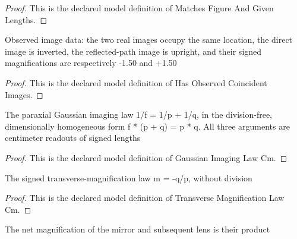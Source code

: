 \begin{proof}
  This is the declared model definition of Matches Figure And Given Lengths.
\end{proof}
\begin{definition}
  \label{def:physics:phyx-mini-0034:phyxminiproblems-problemphyxmini0034-hasobservedcoincidentimages}
  Observed image data: the two real images occupy the same location, the direct image is inverted, the reflected-path image is upright, and their signed magnifications are respectively -1.50 and +1.50
\end{definition}
\begin{proof}
  This is the declared model definition of Has Observed Coincident Images.
\end{proof}
\begin{definition}
  \label{def:physics:phyx-mini-0034:phyxminiproblems-problemphyxmini0034-gaussianimaginglawcm}
  The paraxial Gaussian imaging law 1/f = 1/p + 1/q, in the division-free, dimensionally homogeneous form f * (p + q) = p * q. All three arguments are centimeter readouts of signed lengths
\end{definition}
\begin{proof}
  This is the declared model definition of Gaussian Imaging Law Cm.
\end{proof}
\begin{definition}
  \label{def:physics:phyx-mini-0034:phyxminiproblems-problemphyxmini0034-transversemagnificationlawcm}
  The signed transverse-magnification law m = -q/p, without division
\end{definition}
\begin{proof}
  This is the declared model definition of Transverse Magnification Law Cm.
\end{proof}
\begin{definition}
  \label{def:physics:phyx-mini-0034:phyxminiproblems-problemphyxmini0034-twostagemagnificationlaw}
  The net magnification of the mirror and subsequent lens is their product
\end{definition}

